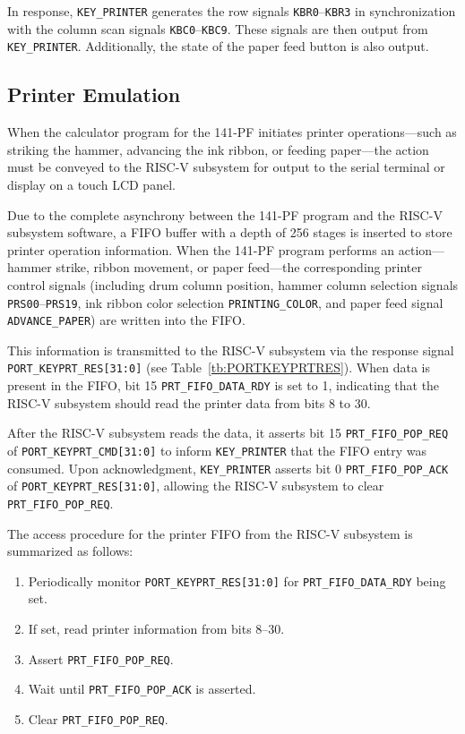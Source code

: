 In response, \texttt{KEY\_PRINTER} generates the row signals \texttt{KBR0}--\texttt{KBR3} in synchronization with the column scan signals \texttt{KBC0}--\texttt{KBC9}. These signals are then output from \texttt{KEY\_PRINTER}. Additionally, the state of the paper feed button is also output.

\subsection{Printer Emulation}
When the calculator program for the 141-PF initiates printer operations—such as striking the hammer, advancing the ink ribbon, or feeding paper—the action must be conveyed to the RISC-V subsystem for output to the serial terminal or display on a touch LCD panel.

Due to the complete asynchrony between the 141-PF program and the RISC-V subsystem software, a FIFO buffer with a depth of 256 stages is inserted to store printer operation information. When the 141-PF program performs an action—hammer strike, ribbon movement, or paper feed—the corresponding printer control signals (including drum column position, hammer column selection signals \texttt{PRS00}--\texttt{PRS19}, ink ribbon color selection \texttt{PRINTING\_COLOR}, and paper feed signal \texttt{ADVANCE\_PAPER}) are written into the FIFO.

This information is transmitted to the RISC-V subsystem via the response signal \texttt{PORT\_KEYPRT\_RES[31:0]} (see Table~\ref{tb:PORTKEYPRTRES}). When data is present in the FIFO, bit 15 \texttt{PRT\_FIFO\_DATA\_RDY} is set to 1, indicating that the RISC-V subsystem should read the printer data from bits 8 to 30.

After the RISC-V subsystem reads the data, it asserts bit 15 \texttt{PRT\_FIFO\_POP\_REQ} of \texttt{PORT\_KEYPRT\_CMD[31:0]} to inform \texttt{KEY\_PRINTER} that the FIFO entry was consumed. Upon acknowledgment, \texttt{KEY\_PRINTER} asserts bit 0 \texttt{PRT\_FIFO\_POP\_ACK} of \texttt{PORT\_KEYPRT\_RES[31:0]}, allowing the RISC-V subsystem to clear \texttt{PRT\_FIFO\_POP\_REQ}.

The access procedure for the printer FIFO from the RISC-V subsystem is summarized as follows:

\begin{enumerate}
  \item Periodically monitor \texttt{PORT\_KEYPRT\_RES[31:0]} for \texttt{PRT\_FIFO\_DATA\_RDY} being set.
  \item If set, read printer information from bits 8--30.
  \item Assert \texttt{PRT\_FIFO\_POP\_REQ}.
  \item Wait until \texttt{PRT\_FIFO\_POP\_ACK} is asserted.
  \item Clear \texttt{PRT\_FIFO\_POP\_REQ}.
\end{enumerate}


